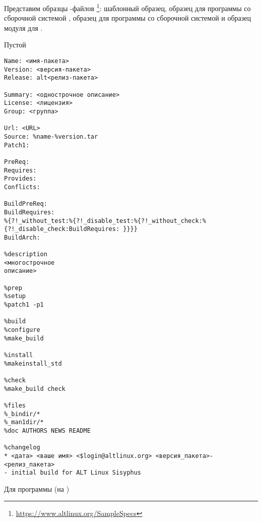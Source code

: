 Представим образцы -файлов%
\footnote{\href{https://www.altlinux.org/SampleSpecs}{https://www.altlinux.org/SampleSpecs}}: шаблонный образец,
образец для программы со сборочной системой , образец для программы со сборочной системой
 и образец модуля для .

 Пустой 
\begin{Verbatim}[breaklines=true,breakanywhere=true,fontsize=\scriptsize]
Name: <имя-пакета>
Version: <версия-пакета>
Release: alt<релиз-пакета>
	
Summary: <однострочное описание>
License: <лицензия>
Group: <группа>

Url: <URL>
Source: %name-%version.tar
Patch1:

PreReq:
Requires:
Provides:
Conflicts:

BuildPreReq:
BuildRequires:
%{?!_without_test:%{?!_disable_test:%{?!_without_check:%{?!_disable_check:BuildRequires: }}}}
BuildArch:

%description
<многострочное
описание>

%prep
%setup
%patch1 -p1

%build
%configure
%make_build

%install
%makeinstall_std

%check
%make_build check

%files
%_bindir/*
%_man1dir/*
%doc AUTHORS NEWS README

%changelog
* <дата> <ваше имя> <$login@altlinux.org> <версия_пакета>-<релиз_пакета>
- initial build for ALT Linux Sisyphus
\end{Verbatim}

\newpage

 Для программы (на )
	
